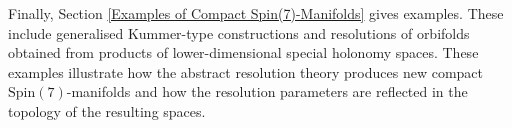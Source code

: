 \documentclass[psamsfonts]{amsart}
\theoremstyle{plain}
\theoremstyle{definition}{
\newtheorem{defi}{Definition}[section]
\newtheorem{ass}{Assumption}
\newtheorem*{nota}{Notation}}
\theoremstyle{remark}{
\newtheorem{rem}{Remark}
\newtheorem{ex}{Example}}
\theoremstyle{plain}{
\newtheorem{thm}{Theorem}[section]
\newtheorem{lem}{Lemma}[section]
\newtheorem{cor}{Corollary}[section]
\newtheorem{prop}{Proposition}[section]
\newtheorem{con}{Conjecture}[section]}
\newcommand{\m}[1]{{\mathrm{#1}}}
\begin{document}
Finally, Section \ref{Examples of Compact Spin(7)-Manifolds} gives examples. These include generalised Kummer-type constructions and resolutions of orbifolds obtained from products of lower-dimensional special holonomy spaces. These examples illustrate how the abstract resolution theory produces new compact $\m{Spin}(7)$-manifolds and how the resolution parameters are reflected in the topology of the resulting spaces.





\end{document}
